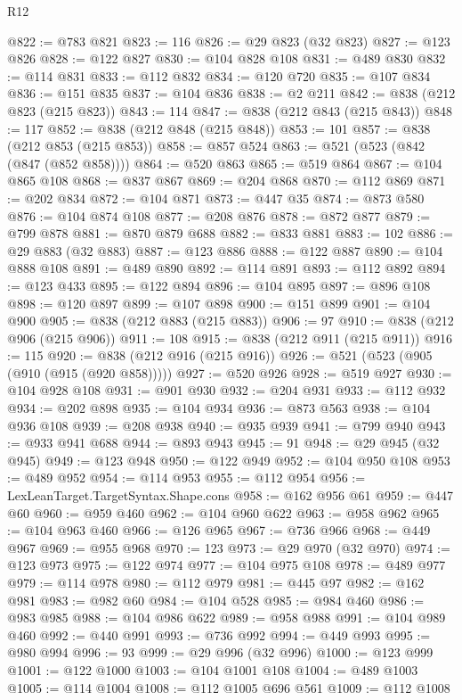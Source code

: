 \begin{lexlean}{R12}
\begin{coremodule}
@822 := @783 @821
@823 := 116
@826 := @29 @823 (@32 @823)
@827 := @123 @826
@828 := @122 @827
@830 := @104 @828 @108
@831 := @489 @830
@832 := @114 @831
@833 := @112 @832
@834 := @120 @720
@835 := @107 @834
@836 := @151 @835
@837 := @104 @836
@838 := @2 @211
@842 := @838 (@212 @823 (@215 @823))
@843 := 114
@847 := @838 (@212 @843 (@215 @843))
@848 := 117
@852 := @838 (@212 @848 (@215 @848))
@853 := 101
@857 := @838 (@212 @853 (@215 @853))
@858 := @857 @524
@863 := @521 (@523 (@842 (@847 (@852 @858))))
@864 := @520 @863
@865 := @519 @864
@867 := @104 @865 @108
@868 := @837 @867
@869 := @204 @868
@870 := @112 @869
@871 := @202 @834
@872 := @104 @871
@873 := @447 @35
@874 := @873 @580
@876 := @104 @874 @108
@877 := @208 @876
@878 := @872 @877
@879 := @799 @878
@881 := @870 @879 @688
@882 := @833 @881
@883 := 102
@886 := @29 @883 (@32 @883)
@887 := @123 @886
@888 := @122 @887
@890 := @104 @888 @108
@891 := @489 @890
@892 := @114 @891
@893 := @112 @892
@894 := @123 @433
@895 := @122 @894
@896 := @104 @895
@897 := @896 @108
@898 := @120 @897
@899 := @107 @898
@900 := @151 @899
@901 := @104 @900
@905 := @838 (@212 @883 (@215 @883))
@906 := 97
@910 := @838 (@212 @906 (@215 @906))
@911 := 108
@915 := @838 (@212 @911 (@215 @911))
@916 := 115
@920 := @838 (@212 @916 (@215 @916))
@926 := @521 (@523 (@905 (@910 (@915 (@920 @858)))))
@927 := @520 @926
@928 := @519 @927
@930 := @104 @928 @108
@931 := @901 @930
@932 := @204 @931
@933 := @112 @932
@934 := @202 @898
@935 := @104 @934
@936 := @873 @563
@938 := @104 @936 @108
@939 := @208 @938
@940 := @935 @939
@941 := @799 @940
@943 := @933 @941 @688
@944 := @893 @943
@945 := 91
@948 := @29 @945 (@32 @945)
@949 := @123 @948
@950 := @122 @949
@952 := @104 @950 @108
@953 := @489 @952
@954 := @114 @953
@955 := @112 @954
@956 := LexLeanTarget.TargetSyntax.Shape.cons
@958 := @162 @956 @61
@959 := @447 @60
@960 := @959 @460
@962 := @104 @960 @622
@963 := @958 @962
@965 := @104 @963 @460
@966 := @126 @965
@967 := @736 @966
@968 := @449 @967
@969 := @955 @968
@970 := 123
@973 := @29 @970 (@32 @970)
@974 := @123 @973
@975 := @122 @974
@977 := @104 @975 @108
@978 := @489 @977
@979 := @114 @978
@980 := @112 @979
@981 := @445 @97
@982 := @162 @981
@983 := @982 @60
@984 := @104 @528
@985 := @984 @460
@986 := @983 @985
@988 := @104 @986 @622
@989 := @958 @988
@991 := @104 @989 @460
@992 := @440 @991
@993 := @736 @992
@994 := @449 @993
@995 := @980 @994
@996 := 93
@999 := @29 @996 (@32 @996)
@1000 := @123 @999
@1001 := @122 @1000
@1003 := @104 @1001 @108
@1004 := @489 @1003
@1005 := @114 @1004
@1008 := @112 @1005 @696 @561
@1009 := @112 @1008

\end{coremodule}
\end{lexlean}
